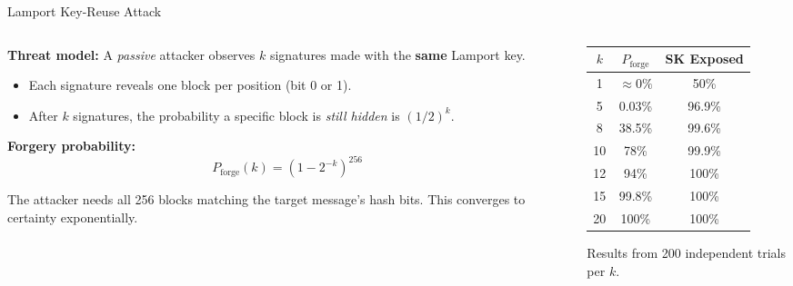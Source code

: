 \documentclass[aspectratio=169, 10pt]{beamer}
\begin{document}
\begin{frame}{Lamport Key-Reuse Attack}

\begin{columns}


\begin{column}{0.55\textwidth}

\vspace{4pt}

\textbf{Threat model:} A \emph{passive} attacker observes $k$ signatures made with the \textbf{same} Lamport key.

\vspace{6pt}
\begin{itemize}
    \item Each signature reveals one block per position (bit 0 or 1).
    \item After $k$ signatures, the probability a specific block is \emph{still hidden} is $(1/2)^k$.
\end{itemize}

\vspace{6pt}
\textbf{Forgery probability:}
\[
    P_{\text{forge}}(k) = \left(1 - 2^{-k}\right)^{256}
\]

\vspace{4pt}
The attacker needs all 256 blocks matching the target message's hash bits. This converges to certainty exponentially.
\end{column}
\begin{column}{0.42\textwidth}
\centering
\begin{tabular}{ccc}
\toprule
$k$ & $P_{\text{forge}}$ & \textbf{SK Exposed} \\
\midrule
1 & $\approx 0\%$ & 50\% \\
5 & 0.03\% & 96.9\% \\
8 & 38.5\% & 99.6\% \\
10 & 78\% & 99.9\% \\
12 & 94\% & 100\% \\
15 & 99.8\% & 100\% \\
\alert{20} & \alert{100\%} & \alert{100\%} \\
\bottomrule
\end{tabular}

\vspace{6pt}
\footnotesize Results from 200 independent trials per $k$.
\end{column}
\end{columns}
\end{frame}
\end{document}
